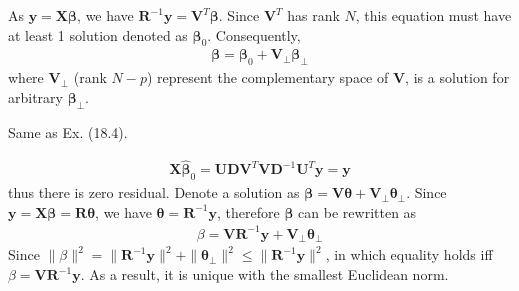 \begin{exercise}
  \begin{exerciseSection}
    As $\mathbf{y} = \mathbf{X}\bm{\beta}$, we have
    $\mathbf{R}^{-1}\mathbf{y} = \mathbf{V}^T\bm{\beta}$. Since $\mathbf{V}^T$
    has rank $N$, this equation must have at least 1 solution denoted as
    $\bm{\beta}_0$. Consequently, 
    \begin{align}
      \bm{\beta} = \bm{\beta}_0 + \mathbf{V}_{\perp}\bm{\beta}_{\perp}
    \end{align}
    where $\mathbf{V}_{\perp}$ (rank $N - p$) represent the complementary space
    of $\mathbf{V}$, is a solution for arbitrary $\bm{\beta}_{\perp}$.
  \end{exerciseSection}
  
  \begin{exerciseSection}
    Same as Ex. (18.4).
  \end{exerciseSection}

  \begin{exerciseSection}
    \begin{align}
      \mathbf{X}\hat{\bm{\beta}}_0 =
      \mathbf{UDV}^T\mathbf{VD}^{-1}\mathbf{U}^T\mathbf{y} = \mathbf{y}
    \end{align}
    thus there is zero residual. Denote a solution as $\bm{\beta} =
    \mathbf{V}\bm{\theta} + \mathbf{V}_{\perp}\bm{\theta}_{\perp}$. Since 
    $\mathbf{y} = \mathbf{X}\bm{\beta} = \mathbf{R}\bm{\theta}$, we have
    $\bm{\theta} = \mathbf{R}^{-1}\mathbf{y}$, therefore $\bm{\beta}$ can be
    rewritten as
    \begin{align}
      \beta = \mathbf{VR}^{-1}\mathbf{y} + \mathbf{V}_{\perp}\bm{\theta}_{\perp}
    \end{align}
    Since $\|\beta \|^2 = \|\mathbf{R}^{-1}\mathbf{y}\|^2 +
    \|\bm{\theta}_{\perp}\|^2 \leq \|\mathbf{R}^{-1}\mathbf{y}\|^2$, in which
    equality holds iff $\beta = \mathbf{VR}^{-1}\mathbf{y}$. As a result, it
    is unique with the smallest Euclidean norm.
  \end{exerciseSection}
\end{exercise}

